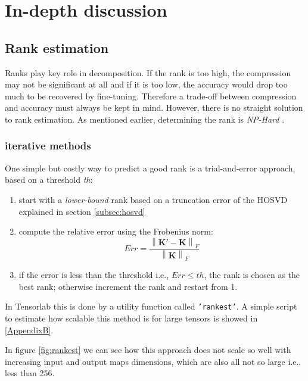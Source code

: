 \pagebreak
\section{In-depth discussion}

\subsection{Rank estimation}
Ranks play key role in decomposition. If the rank is too high, the compression may not be significant at all and if it is too low, the accuracy would drop too much to be recovered by fine-tuning. Therefore a trade-off between compression and accuracy must always be kept in mind. 
\newline 
However, there is no straight solution to rank estimation. As mentioned earlier, determining the rank is \emph{NP-Hard} \parencite{rank-hard1}\parencite{rank-hard2}\parencite{rank-hard3}. \\
 
\subsubsection{iterative methods}
One simple but costly way to predict a good rank is a trial-and-error approach, based on a threshold \emph{th}:
	\begin{enumerate}
		\item start with a \emph{lower-bound} rank based on a truncation error of the HOSVD explained in section \ref{subsec:hosvd}
		\item compute the relative error using the Frobenius norm: $$ Err = \frac{\left \| \mathbf{K'} - \mathbf{K}  \right \|_{F}}{\left \| \mathbf{K} \right \|_{F}}$$
		\item if the error is less than the threshold i.e., $Err \leq th$, the rank is chosen as the best rank; otherwise increment the rank and restart from 1. 
	\end{enumerate}

In Tensorlab this is done by a utility function called \texttt{'rankest'}. A simple script to estimate how scalable this method is for large tensors is showed in \ref{AppendixB}. 

In figure \ref{fig:rankest} we can see how this approach does not scale so well with increasing input and output maps dimensions, which are also all not so large i.e., less than 256.


